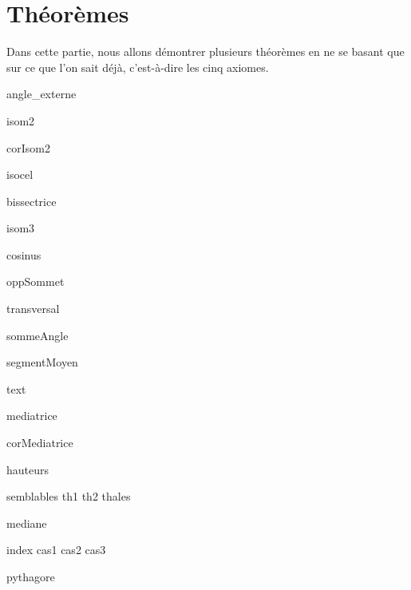 \documentclass[a4paper,12pt]{article}
\begin{document}
\section{Théorèmes}
Dans cette partie, nous allons démontrer plusieurs théorèmes en ne se basant que sur ce que l'on sait déjà, c'est-à-dire les cinq axiomes.

{angle_externe}

{isom2}

{corIsom2}

{isocel}

{bissectrice}

{isom3}

{cosinus}

{oppSommet}

{transversal}

{sommeAngle}

{segmentMoyen}

{text}

{mediatrice}
 
{corMediatrice}

{hauteurs}

{semblables}
{th1}
{th2}
{thales}

{mediane}

{index}
{cas1}
{cas2}
{cas3}

{pythagore}
\end{document}
